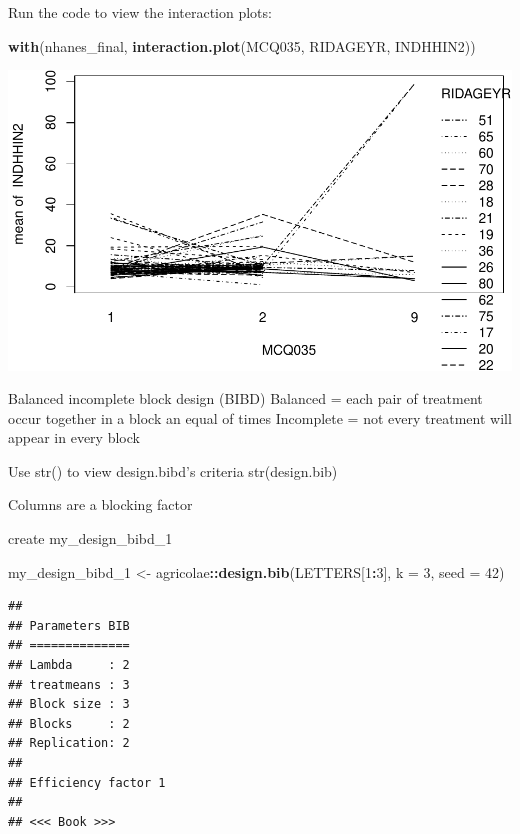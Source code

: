 \documentclass[]{book}
\newenvironment{Shaded}{\begin{snugshade}}{\end{snugshade}}
\newcommand{\DataTypeTok}[1]{\textcolor[rgb]{0.13,0.29,0.53}{#1}}
\newcommand{\DecValTok}[1]{\textcolor[rgb]{0.00,0.00,0.81}{#1}}
\newcommand{\KeywordTok}[1]{\textcolor[rgb]{0.13,0.29,0.53}{\textbf{#1}}}
\newcommand{\NormalTok}[1]{#1}
\newcommand{\OperatorTok}[1]{\textcolor[rgb]{0.81,0.36,0.00}{\textbf{#1}}}
\newcommand{\StringTok}[1]{\textcolor[rgb]{0.31,0.60,0.02}{#1}}
\begin{document}
Run the code to view the interaction plots:

\begin{Shaded}
\begin{Highlighting}[]
\KeywordTok{with}\NormalTok{(nhanes_final, }\KeywordTok{interaction.plot}\NormalTok{(MCQ035, RIDAGEYR, INDHHIN2))}
\end{Highlighting}
\end{Shaded}

\includegraphics{code4stem_files/figure-latex/view final-1.pdf}

Balanced incomplete block design (BIBD)
Balanced = each pair of treatment occur together in a block an equal of times
Incomplete = not every treatment will appear in every block

Use str() to view design.bibd's criteria
str(design.bib)

Columns are a blocking factor

create my\_design\_bibd\_1

\begin{Shaded}
\begin{Highlighting}[]
\NormalTok{my_design_bibd_}\DecValTok{1}\NormalTok{ <-}\StringTok{ }\NormalTok{agricolae}\OperatorTok{::}\KeywordTok{design.bib}\NormalTok{(LETTERS[}\DecValTok{1}\OperatorTok{:}\DecValTok{3}\NormalTok{], }\DataTypeTok{k =} \DecValTok{3}\NormalTok{, }\DataTypeTok{seed =} \DecValTok{42}\NormalTok{)}
\end{Highlighting}
\end{Shaded}

\begin{verbatim}
## 
## Parameters BIB
## ==============
## Lambda     : 2
## treatmeans : 3
## Block size : 3
## Blocks     : 2
## Replication: 2 
## 
## Efficiency factor 1 
## 
## <<< Book >>>
\end{verbatim}
\end{document}
